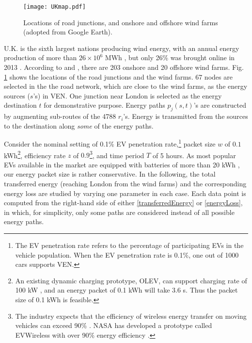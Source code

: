 \documentclass[journal]{IEEEtran}
\begin{document}
\begin{figure}[!t]
\centering
\texttt{[image: UKmap.pdf]} \vspace{-0.3cm}
\caption{Locations of road junctions, and onshore and offshore wind farms (adopted from Google Earth).}
\label{fig:UKmap}
\vspace{-0.2cm}
\end{figure}

U.K. is the sixth largest nations producing wind energy, with an annual energy
production of more than $26\times 10^6$ MWh \cite{UKWindDB}, but only 26\% was brought online in 2013 \cite{UKWind}. According to \cite{offshore} and \cite{onshore}, there are 203 onshore and 20 offshore wind farms. Fig. \ref{fig:UKmap} shows the locations of the road junctions and the wind farms. 67 nodes are selected in the the road network, which are close to the wind farms, as the energy sources ($s$'s) in VEN. One junction near London is selected as the energy destination $t$ for demonstrative purpose. Energy paths $p_j(s,t)$'s are constructed by augmenting sub-routes of the 4788 $r_i$'s. Energy is transmitted from the sources to the destination along \textit{some} of the energy paths. 


Consider the nominal setting of  0.1\% EV penetration rate,\footnote{The EV penetration rate refers to the percentage of participating EVs in the vehicle population. When the EV penetration rate is 0.1\%, one out of 1000 cars supports VEN.} packet size $w$ of $0.1$ kWh\footnote{An existing dynamic charging prototype, OLEV, can support charging rate of 100 kW \cite{kaist}, and an energy packet of 0.1 kWh will take 3.6 s. Thus the packet size of 0.1 kWh is feasible.}, efficiency rate $z$ of $0.9$\footnote{The industry expects that the efficiency of wireless energy transfer on moving vehicles can exceed 90\% \cite{theengineer}. NASA has developed a prototype called EVWireless with over 90\% energy efficiency \cite{EVWireless}.}, and time period $T$ of 5 hours.  As most popular EVs available in the market are equipped with batteries of more than 20 kWh \cite{batterycap}, our energy packet size is rather conservative. In the following, the total transferred energy (reaching London from the wind farms) and the corresponding energy loss are studied by varying one parameter in each case.  Each data point is computed from the right-hand side of either \eqref{transferredEnergy} or \eqref{energyLoss}, in which, for simplicity, only some paths are considered instead of all possible energy paths.
\end{document}

